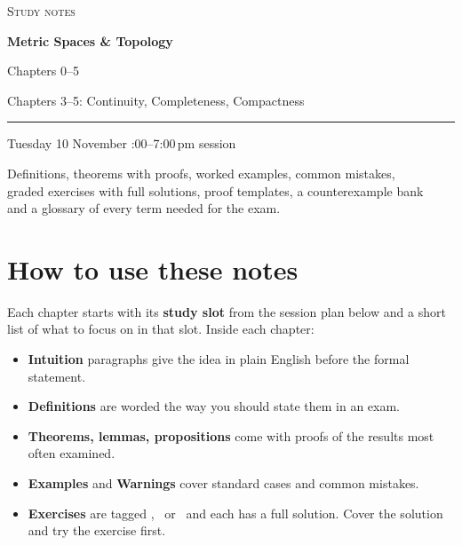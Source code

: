 \begin{titlepage}
\centering
\vspace*{3cm}
{\scshape\large Study notes\par}
\vspace{0.6cm}
{\Huge\bfseries Metric Spaces \& Topology\par}
\vspace{0.5cm}
\iffull
{\Large Chapters 0--5\par}
\else
{\Large Chapters 3--5: Continuity, Completeness, Compactness\par}
\fi
\vspace{1.2cm}
\rule{0.6\textwidth}{0.4pt}\par
\vspace{0.6cm}
{\large Tuesday 10 November :00--7:00\,pm session\par}
\vfill
{\small Definitions, theorems with proofs, worked examples, common mistakes,\\
graded exercises with full solutions, proof templates, a counterexample bank\\
and a glossary of every term needed for the exam.\par}
\vspace{1cm}
\end{titlepage}

\chapter*{How to use these notes}

Each chapter starts with its \textbf{study slot} from the session plan below and a short list of what to focus on in that slot. Inside each chapter:

\begin{itemize}
  \item \textbf{Intuition} paragraphs give the idea in plain English before the formal statement.
  \item \colorbox{defbg}{\textbf{Definitions}} are worded the way you should state them in an exam.
  \item \colorbox{thmbg}{\textbf{Theorems, lemmas, propositions}} come with proofs of the results most often examined.
  \item \colorbox{exbg}{\textbf{Examples}} and \colorbox{warnbg}{\textbf{Warnings}} cover standard cases and common mistakes.
  \item \textbf{Exercises} are tagged \easy, \medium\ or \hard\ and each has a full solution. Cover the solution and try the exercise first.
\end{itemize}

